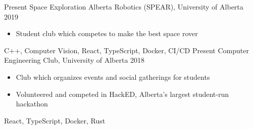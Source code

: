 
\begin{experiences}
  \experience
    {Present}   {Space Exploration Alberta Robotics (SPEAR), }{University of Alberta}{}
    {2019} {
                      \begin{itemize}
                        \item Student club which competes to make the best space rover
                      \end{itemize}
                    }
                    {
                        C++,
                        Computer Vision,
                        React,
                        TypeScript,
                        Docker,
                        CI/CD
                    }
  \experience
  {Present}   {Computer Engineering Club, }{University of Alberta}{}
  {2018} {
                    \begin{itemize}
                      \item Club which organizes events and social gatherings for students
                      \item Volunteered and competed in HackED, Alberta's largest student-run hackathon
                    \end{itemize}
                  }
                  {
                      React,
                      TypeScript,
                      Docker,
                      Rust
                  }

\end{experiences}